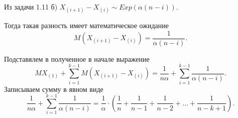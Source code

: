 Из задачи 1.11 б)
$X_{ \left( i + 1 \right) } - X_{ \left( i \right) } \sim
  Exp \left( \alpha \left( n - i \right) \right) $.

Тогда такая разность имеет математическое ожидание
$$M \left( X_{ \left( i + 1 \right) } - X_{ \left( i \right) } \right) =
  \frac{1}{ \alpha \left( n - i \right) }.$$

Подставялем в полученное в начале выражение
$$MX_{ \left( 1 \right) } +
  \sum \limits_{i = 1}^{k - 1}
    M \left( X_{ \left( i + 1 \right) } - X_{ \left(i \right) } \right) =
  \frac{1}{n \alpha } + \sum \limits_{i = 1}^{k - 1} \frac{1}{ \alpha \left( n - i \right) }.$$
Записываем сумму в явном виде
$$ \frac{1}{n \alpha } + \sum \limits_{i = 1}^{k - 1} \frac{1}{ \alpha \left( n - i \right) } =
  \frac{1}{ \alpha } \cdot
  \left( \frac{1}{n} + \frac{1}{n - 1} + \frac{1}{n - 2} + \dotsc + \frac{1}{n - k + 1} \right).$$
